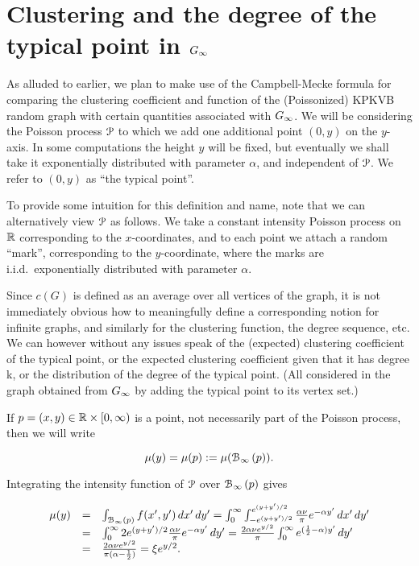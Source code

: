 


\section{Clustering and the degree of the typical point in \texorpdfstring{$G_{\infty}$}{G infinity}\label{sec:Ginf}\label{sec:asymptotics_average_clustering_ast_P}}


As alluded to earlier, we plan to make use of the Campbell-Mecke formula for comparing the clustering coefficient and function of the (Poissonized) KPKVB random graph 
with certain quantities associated with $G_{\infty}$.
We will be considering the Poisson process ${\mathcal P}$ to which we add one additional point $(0,y)$ on the $y$-axis.
In some computations the height $y$ will be fixed, but eventually we shall take it exponentially distributed with parameter $\alpha$, and
independent of ${\mathcal P}$.
We refer to $(0,y)$ as ``the typical point''.

To provide some intuition for this definition and name, note that we can alternatively view ${\mathcal P}$ as follows. 
We take a constant intensity Poisson process on ${\mathbb R}$ corresponding to the $x$-coordinates, and to each point
we attach a random ``mark'', corresponding to the $y$-coordinate, where the marks are i.i.d.~exponentially distributed with parameter $\alpha$.


Since $c(G)$ is defined as an average over all vertices of the graph, it is not immediately obvious how to meaningfully define 
a corresponding notion for infinite graphs, and similarly for the clustering function, the degree sequence, etc.
We can however without any issues speak of the (expected) clustering coefficient of the typical point, or the expected clustering
coefficient given that it has degree k, or the distribution of the degree of the typical point.
(All considered in the graph obtained from $G_{\infty}$ by adding the typical point to its vertex set.)

If $p = (x,y) \in {\mathbb R}\times[0,\infty)$ is a point, not necessarily part of the Poisson process, then we will write

$$ \mu(y) = \mu(p) := \mu({\mathcal B}_{\infty}\left(p\right)). $$

Integrating the intensity function of ${\mathcal P}$ over ${\mathcal B}_{\infty}\left(p\right)$ gives

$$ \begin{array}{rcl} 
\mu(y) & = & \int_{{\mathcal B}_{\infty}\left(p\right)} f(x',y') \, dx' \,d y'  
 = \int_0^\infty \int_{-e^{(y+y')/2}}^{e^{(y+y')/2}} \frac{\alpha \nu}{\pi} e^{-\alpha y'} \, dx' \, dy' \\
& = & \int_0^\infty 2 e^{(y+y')/2} \frac{\alpha \nu}{\pi} e^{-\alpha y'} \, dy' 
 = \frac{2\alpha \nu e^{y/2}}{\pi} \int_0^\infty e^{(\frac12-\alpha)y'} \, dy' \\
& = & \frac{2\alpha \nu e^{y/2}}{\pi(\alpha-\frac12)} = \xi e^{y/2}.
\end{array} $$





